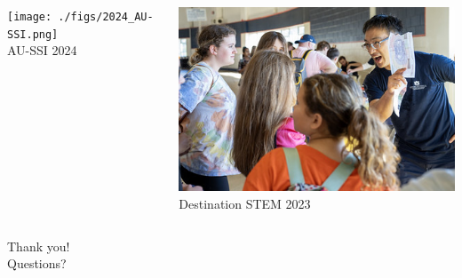 \documentclass[9pt,table,xcolor=dvipsnames]{beamer}
\begin{document}
\begin{frame}
\begin{columns}[T,onlytextwidth]
    \centering
    \texttt{[image: ./figs/2024\_AU-SSI.png]}\\[0.3em]
    {\footnotesize AU-SSI 2024}

    \medskip

    \includegraphics[width=\linewidth]{./figs/2023_Destination-STEM.jpg}\\[0.3em]
    {\footnotesize Destination STEM 2023}
  \end{columns}
\end{frame}
\begin{frame}[fragile] %
  \begin{center}
    \LARGE Thank you! \\
    \bigskip
    \large Questions?
  \end{center}
\end{frame}
\end{document}
